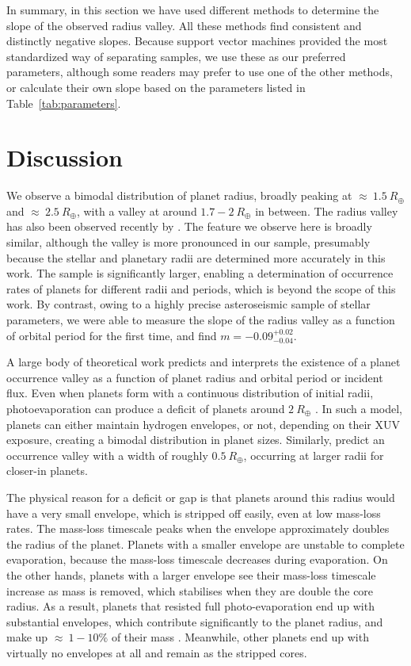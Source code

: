 \documentclass[a4paper,fleqn,usenatbib]{mnras}
\begin{document}
In summary, in this section we have used different methods to determine the slope of the observed radius valley. All these methods find consistent and distinctly negative slopes. Because support vector machines provided the most standardized way of separating samples, we use these as our preferred parameters, although some readers may prefer to use one of the other methods, or calculate their own slope based on the parameters listed in Table~\ref{tab:parameters}.


\section{Discussion}
\label{sec:models}

We observe a bimodal distribution of planet radius, broadly peaking at $\approx~1.5~R_\oplus$ and $\approx~2.5~R_\oplus$, with a valley at around $1.7-2~R_\oplus$ in between. The radius valley has also been observed recently by \cite{fulton2017}. The feature we observe here is broadly similar, although the valley is more pronounced in our sample, presumably because the stellar and planetary radii are determined more accurately in this work. The \cite{fulton2017} sample is significantly larger, enabling a determination of occurrence rates of planets for different radii and periods, which is beyond the scope of this work. By contrast, owing to a highly precise asteroseismic sample of stellar parameters, we were able to measure the slope of the radius valley as a function of orbital period for the first time, and find $m = -0.09^{+0.02}_{-0.04}$. 

A large body of theoretical work predicts and interprets the existence of a planet occurrence valley as a function of planet radius and orbital period or incident flux. Even when planets form with a continuous distribution of initial radii, photoevaporation can produce a deficit of planets around $2~R_\oplus$ \citep{owen2013}. In such a model, planets can either maintain hydrogen envelopes, or not, depending on their XUV exposure, creating a bimodal distribution in planet sizes. Similarly, \cite{lopez2013} predict an occurrence valley with a width of roughly $0.5~R_\oplus$, occurring at larger radii for closer-in planets. 

The physical reason for a deficit or gap is that planets around this radius would have a very small envelope, which is stripped off easily, even at low mass-loss rates. The mass-loss timescale peaks when the envelope approximately doubles the radius of the planet. Planets with a smaller envelope are unstable to complete evaporation, because the mass-loss timescale decreases during evaporation. On the other hands, planets with a larger envelope see their mass-loss timescale increase as mass is removed, which stabilises when they are double the core radius. As a result, planets that resisted full photo-evaporation end up with substantial envelopes, which contribute significantly to the planet radius, and make up $\approx~1-10\%$ of their mass \citep{lopez2014}. Meanwhile, other planets end up with virtually no envelopes at all and remain as the stripped cores.
\end{document}
